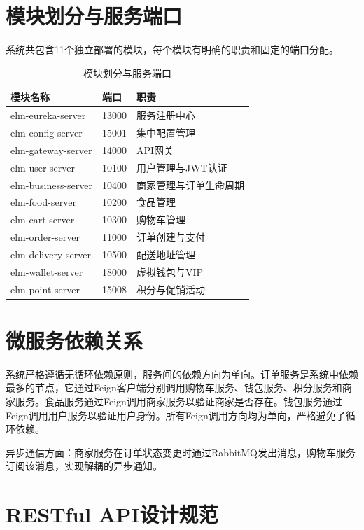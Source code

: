 \section{模块划分与服务端口}

系统共包含11个独立部署的模块，每个模块有明确的职责和固定的端口分配。

\begin{table}[H]
	\centering
	\caption{模块划分与服务端口}
	\begin{tabular}{p{5.5cm}p{2.5cm}p{6.0cm}}
		\hline
		\textbf{模块名称} & \textbf{端口} & \textbf{职责} \\
		\hline
		elm-eureka-server & 13000 & 服务注册中心 \\
		elm-config-server & 15001 & 集中配置管理 \\
		elm-gateway-server & 14000 & API网关 \\
		elm-user-server & 10100 & 用户管理与JWT认证 \\
		elm-business-server & 10400 & 商家管理与订单生命周期 \\
		elm-food-server & 10200 & 食品管理 \\
		elm-cart-server & 10300 & 购物车管理 \\
		elm-order-server & 11000 & 订单创建与支付 \\
		elm-delivery-server & 10500 & 配送地址管理 \\
		elm-wallet-server & 18000 & 虚拟钱包与VIP \\
		elm-point-server & 15008 & 积分与促销活动 \\
		\hline
	\end{tabular}
\end{table}

\section{微服务依赖关系}

系统严格遵循无循环依赖原则，服务间的依赖方向为单向。订单服务是系统中依赖最多的节点，它通过Feign客户端分别调用购物车服务、钱包服务、积分服务和商家服务。食品服务通过Feign调用商家服务以验证商家是否存在。钱包服务通过Feign调用用户服务以验证用户身份。所有Feign调用方向均为单向，严格避免了循环依赖。

异步通信方面：商家服务在订单状态变更时通过RabbitMQ发出消息，购物车服务订阅该消息，实现解耦的异步通知。

\section{RESTful API设计规范}

